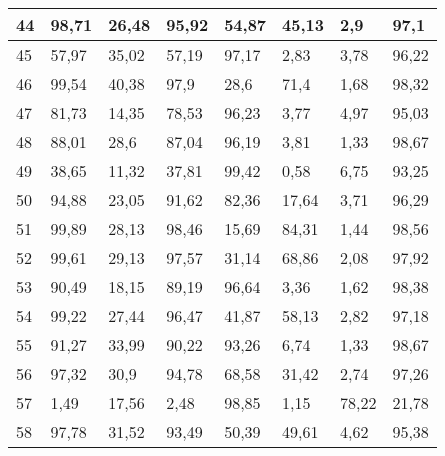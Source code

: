 \begin{longtable}[c]{|l|l|l|l|l|l|l|l|}
44              & 98,71        & 26,48        & 95,92       & 54,87         & 45,13         & 2,9           & 97,1          \\ \hline
45              & 57,97        & 35,02        & 57,19       & 97,17         & 2,83          & 3,78          & 96,22         \\ \hline
46              & 99,54        & 40,38        & 97,9        & 28,6          & 71,4          & 1,68          & 98,32         \\ \hline
47              & 81,73        & 14,35        & 78,53       & 96,23         & 3,77          & 4,97          & 95,03         \\ \hline
48              & 88,01        & 28,6         & 87,04       & 96,19         & 3,81          & 1,33          & 98,67         \\ \hline
49              & 38,65        & 11,32        & 37,81       & 99,42         & 0,58          & 6,75          & 93,25         \\ \hline
50              & 94,88        & 23,05        & 91,62       & 82,36         & 17,64         & 3,71          & 96,29         \\ \hline
51              & 99,89        & 28,13        & 98,46       & 15,69         & 84,31         & 1,44          & 98,56         \\ \hline
52              & 99,61        & 29,13        & 97,57       & 31,14         & 68,86         & 2,08          & 97,92         \\ \hline
53              & 90,49        & 18,15        & 89,19       & 96,64         & 3,36          & 1,62          & 98,38         \\ \hline
54              & 99,22        & 27,44        & 96,47       & 41,87         & 58,13         & 2,82          & 97,18         \\ \hline
55              & 91,27        & 33,99        & 90,22       & 93,26         & 6,74          & 1,33          & 98,67         \\ \hline
56              & 97,32        & 30,9         & 94,78       & 68,58         & 31,42         & 2,74          & 97,26         \\ \hline
57              & 1,49         & 17,56        & 2,48        & 98,85         & 1,15          & 78,22         & 21,78         \\ \hline
58              & 97,78        & 31,52        & 93,49       & 50,39         & 49,61         & 4,62          & 95,38         \\ \hline

\end{longtable}
